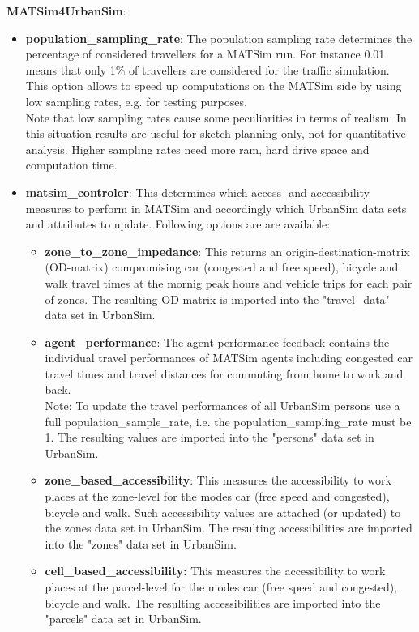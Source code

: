 \documentclass[a4paper,11pt]{report}
\begin{document}
\textbf{MATSim4UrbanSim}:
\begin{itemize}
	\item \textbf{population\_sampling\_rate}: The population  sampling rate determines the percentage of considered travellers for a  MATSim run. For instance 0.01 means that only 1\% of travellers are  considered for the traffic simulation. This option allows to speed up  computations on the MATSim side by using low sampling rates, e.g. for  testing purposes.
\\   Note that low sampling rates cause some peculiarities in terms of  realism. In this situation results are useful for sketch planning only,  not for quantitative analysis. Higher sampling rates need more ram, hard  drive space and computation time.
	\item \textbf{matsim\_controler}: This determines which access-  and accessibility measures to perform in MATSim and accordingly which  UrbanSim data sets and attributes to update. Following options are are  available:   
\begin{itemize}
	\item \textbf{zone\_to\_zone\_impedance}: This returns an  origin-destination-matrix (OD-matrix) compromising car (congested and  free speed), bicycle and walk travel times at the mornig peak hours and  vehicle trips for each pair of zones. The resulting OD-matrix is  imported into the "travel\_data" data set in UrbanSim.
	\item \textbf{agent\_performance}: The agent performance  feedback contains the individual travel performances of MATSim agents  including congested car travel times and travel distances for commuting  from home to work and back.
\\     Note: To update the travel performances of all UrbanSim persons use a  full population\_sample\_rate, i.e. the population\_sampling\_rate must be  1. The resulting values are imported into the "persons" data set in  UrbanSim.
	\item \textbf{zone\_based\_accessibility}: This measures the  accessibility to work places at the zone-level for the modes car (free  speed and congested), bicycle and walk. Such accessibility values are  attached (or updated) to the zones data set in UrbanSim. The resulting  accessibilities are imported into the "zones" data set in UrbanSim.
	\item \textbf{cell\_based\_accessibility: }This measures the  accessibility to work places at the parcel-level for the modes car (free  speed and congested), bicycle and walk. The resulting accessibilities  are imported into the "parcels" data set in UrbanSim.

\end{itemize}
\end{itemize}
\end{document}
